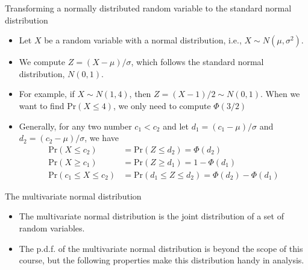 \documentclass[presentation]{beamer}
\begin{document}
\begin{frame}[label={sec:org0fcface}]{Transforming a normally distributed random variable to the standard normal distribution}
\begin{itemize}
\item Let \(X\) be a random variable with a normal distribution, i.e., \(X \sim
  N(\mu, \sigma^2)\).
\item We compute \(Z = (X-\mu)/\sigma\), which follows
the standard normal distribution, \(N(0, 1)\).
\item For example, if \(X \sim N(1, 4)\), then \(Z = (X-1)/2 \sim N(0,
  1)\). When we want to find \(\mathrm{Pr}(X \leq 4)\), we only need to
compute \(\Phi(3/2)\)
\item Generally, for any two number \(c_1 < c_2\) and let \(d_1 = (c_1 - \mu)/\sigma\) and
\(d_2 = (c_2 - \mu)/\sigma\), we have
\begin{align*}
\mathrm{Pr}(X \leq c_2) & = \mathrm{Pr}(Z \leq d_2) = \Phi(d_2) \\
\mathrm{Pr}(X \geq c_1) & = \mathrm{Pr}(Z \geq d_1) = 1 - \Phi(d_1) \\
\mathrm{Pr}(c_1 \leq X \leq c_2) & = \mathrm{Pr}(d_1 \leq Z \leq d_2) = \Phi(d_2) - \Phi(d_1)
\end{align*}
\end{itemize}
\end{frame}

\begin{frame}[label={sec:orgffd2b94}]{The multivariate normal distribution}
\begin{itemize}
\item The multivariate normal distribution is the joint
distribution of a set of random variables.

\item The p.d.f. of the multivariate normal distribution is beyond the
scope of this course, but the following properties make this
distribution handy in analysis.
\end{itemize}
\end{frame}
\end{document}
